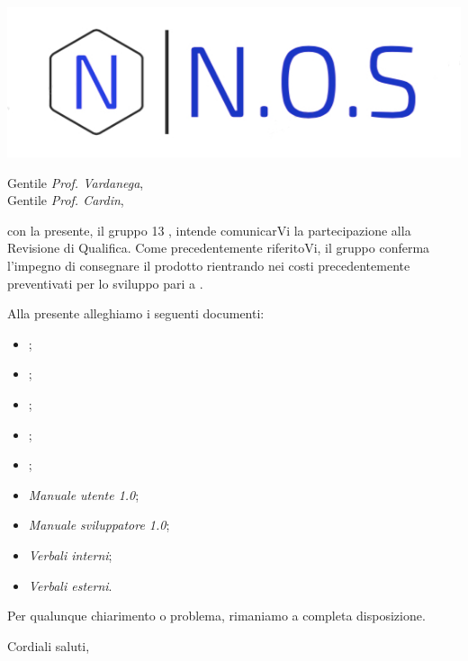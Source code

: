 \documentclass[12pt]{letter}
\date{30 aprile 2021}
\begin{document}
\begin{letter}{ }

\includegraphics[scale=1.5
]{../../../Immagini/N.O.S.jpg}

\opening{Gentile \textit{Prof. Vardanega},\\ Gentile \textit{Prof. Cardin}, }

con la presente, il gruppo 13 {\Gruppo}, intende comunicarVi la partecipazione alla Revisione di Qualifica.
Come precedentemente riferitoVi, il gruppo conferma l'impegno di consegnare il prodotto rientrando nei costi precedentemente preventivati per lo sviluppo pari a .

Alla presente alleghiamo i seguenti documenti:

\begin{itemize}
	\item {};
	\item {};
	\item {};
	\item {};
	\item {};
	\item \textit{Manuale utente 1.0};
	\item \textit{Manuale sviluppatore 1.0};
	\item \textit{Verbali interni};
	\item \textit{Verbali esterni}.
\end{itemize}

Per qualunque chiarimento o problema, rimaniamo a completa disposizione.

\closing{Cordiali saluti,}

\vspace{2em}

\end{letter}
\end{document}
